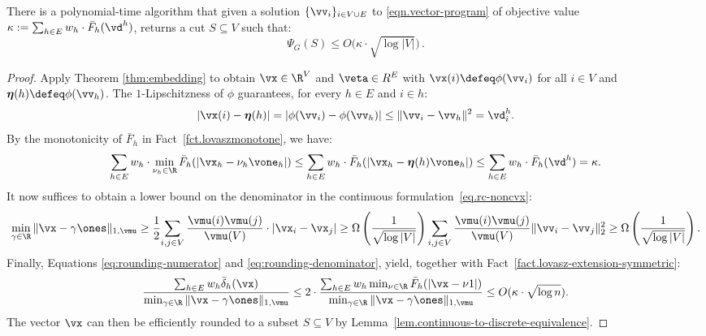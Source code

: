 \documentclass[letterpaper]{article}
\begin{document}
\begin{lemma}\label{lem.sqrt-logn-rounding-symmetric}
There is a polynomial-time algorithm that given a solution $\{\vv_i\}_{i \in V \cup E}$ to \eqref{eqn.vector-program} of objective value $\kappa :=  \sum_{h\in E} w_h \cdot \bar{F}_h(\vd^h)$, returns a cut $S \subseteq V$ such that:
\[
    \Psi_G(S) \leq O \big( \kappa \cdot \sqrt{\log |V|} \big) \, .
\]
\end{lemma}
\begin{proof}
Apply Theorem \ref{thm:embedding} to obtain $\vx \in \R^{V}$ and $\veta \in R^E$ with  $\vx(i) \defeq \phi(\vv_i)$ for all $i \in V$ and $\boldsymbol{\eta}(h) \defeq \phi(\vv_h) $. The $1$-Lipschitzness of $\phi$ guarantees, for every $h \in E$ and $i \in h$:
\begin{equation*}
  \lvert \vx(i) - \boldsymbol{\eta}(h) \rvert =
  \lvert \phi(\vv_i) - \phi(\vv_h) \rvert \leq \|\vv_i - \vv_h\|^2 = \vd^h_i.
\end{equation*}
By the monotonicity of $\bar{F}_h$ in Fact~\ref{fct.lovaszmonotone}, we have:
\begin{equation}\label{eq:rounding-numerator}
  \sum_{h \in E} w_h \cdot \min_{\nu_h \in \R} \bar{F}_h(|\vx_h - \nu_h \vone_h|)
  \leq  \sum_{h \in E} w_h \cdot \bar{F}_h(|\vx_h - \boldsymbol{\eta}(h) \vone_h|)
  \leq \sum_{h \in E} w_h \cdot \bar{F}_h(\vd^h)
  = \kappa.
\end{equation}
It now suffices to obtain a lower bound on the denominator in the continuous formulation~\eqref{eq.rc-noncvx}:
\begin{equation}\label{eq:rounding-denominator}
  {\min_{\gamma \in \R} \|\vx - \gamma \ones\|_{1, \vmu}} \geq {1\over 2}{\sum_{i,j\in V} {\vmu(i) \vmu(j) \over \vmu(V)}\cdot |\vx_i - \vx_j|}
  \geq  \Omega\left( {1 \over \sqrt{\log |V|}}\right) {\sum_{i,j\in V} {\vmu(i) \vmu(j) \over \vmu(V)} \| \vv_i - \vv_j\|^2_2 }
  \geq \Omega\left( {1 \over \sqrt{\log |V|}}\right).
\end{equation}
Finally, Equations \eqref{eq:rounding-numerator} and \eqref{eq:rounding-denominator}, yield, together with Fact~\ref{fact.lovasz-extension-symmetric}:
\[
   {\sum_{h \in E} w_h  \bar{\delta}_h (\vx) \over \min_{\gamma \in \R} \|\vx - \gamma\ones\|_{1, \vmu}} \leq 2 \cdot
  {\sum_{h \in E} w_h \min_{\nu \in \R} \bar{F}_h(|\vx - \nu 1|) \over \min_{\gamma \in \R} \|\vx - \gamma\ones\|_{1, \vmu}}
  \leq
  O(\kappa \cdot \sqrt{\log n}).
\]
The vector $\vx$ can then be efficiently rounded to a subset $S\subseteq V$ by Lemma~\ref{lem.continuous-to-discrete-equivalence}.
\end{proof}
 
\end{document}
